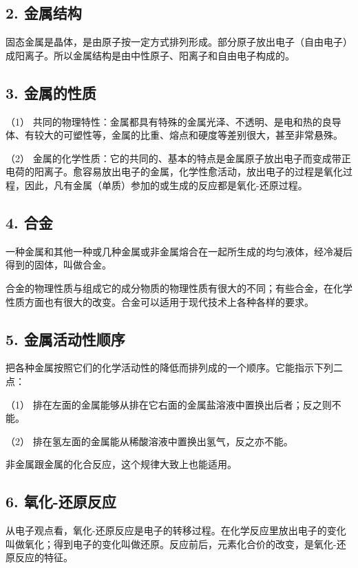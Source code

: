 \subsection{2. 金属结构}

固态金属是晶体，是由原子按一定方式排列形成。部分原子放出电子（自由电子）成阳离子。所以金属结构是由中性原子、阳离子和自由电子构成的。

\subsection{3. 金属的性质}

（1）
共同的物理特性：金属都具有特殊的金属光泽、不透明、是电和热的良导体、有较大的可塑性等，金属的比重、熔点和硬度等差别很大，甚至非常悬殊。

（2）
金属的化学性质：它的共同的、基本的特点是金属原子放出电子而变成带正电荷的阳离子。愈容易放出电子的金属，化学性愈活动，放出电子的过程是氧化过程，因此，凡有金属（单质）参加的或生成的反应都是氧化-还原过程。

\subsection{4. 合金}

一种金属和其他一种或几种金属或非金属熔合在一起所生成的均匀液体，经冷凝后得到的固体，叫做合金。

合金的物理性质与组成它的成分物质的物理性质有很大的不同；有些合金，在化学性质方面也有很大的改变。合金可以适用于现代技术上各种各样的要求。

\subsection{5. 金属活动性顺序}

把各种金属按照它们的化学活动性的降低而排列成的一个顺序。它能指示下列二点：

（1）
排在左面的金属能够从排在它右面的金属盐溶液中置换出后者；反之则不能。

（2） 排在氢左面的金属能从稀酸溶液中置换出氢气，反之亦不能。

非金属跟金属的化合反应，这个规律大致上也能适用。

\subsection{6. 氧化-还原反应}

从电子观点看，氧化-还原反应是电子的转移过程。在化学反应里放出电子的变化叫做氧化；得到电子的变化叫做还原。反应前后，元素化合价的改变，是氧化-还原反应的特征。

